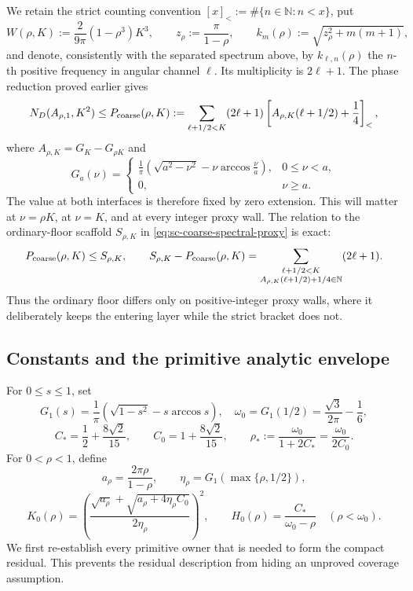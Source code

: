 \documentclass[11pt]{article}
\numberwithin{equation}{section}
\theoremstyle{definition}
\theoremstyle{remark}
\begin{document}
We retain the strict counting convention
\([x]_<:=\#\{n\in\mathbb N:n<x\}\), put
\[
 W(\rho,K):=\frac{2}{9\pi}(1-\rho^3)K^3,
 \qquad z_\rho:=\frac{\pi}{1-\rho},
 \qquad k_m(\rho):=\sqrt{z_\rho^2+m(m+1)},
\]
and denote, consistently with the separated spectrum above, by
\(k_{\ell,n}(\rho)\) the \(n\)-th positive frequency in
angular channel \(\ell\).  Its multiplicity is \(2\ell+1\).  The phase
reduction proved earlier gives
\begin{equation}
 N_D(A_{\rho,1},K^2)
 \le P_{\rm coarse}(\rho,K)
 :=\sum_{\ell+1/2<K}(2\ell+1)
 \left[A_{\rho,K}(\ell+1/2)+\frac14\right]_<,
 \label{cm:eq-coarse}
\end{equation}
where \(A_{\rho,K}=G_K-G_{\rho K}\) and
\[
 G_a(\nu)=
 \begin{cases}
 \displaystyle\frac1\pi\left(\sqrt{a^2-\nu^2}
 -\nu\arccos\frac\nu a\right),&0\leq\nu<a,\\[4pt]
 0,&\nu\geq a.
 \end{cases}
\]
The value at both interfaces is therefore fixed by zero extension.  This
 will matter at \(\nu=\rho K\), at \(\nu=K\), and at every integer proxy
 wall.
The relation to the ordinary-floor scaffold
\(S_{\rho,K}\) in \eqref{eq:sc-coarse-spectral-proxy} is exact:
\begin{equation}
 P_{\rm coarse}(\rho,K)\leq S_{\rho,K},\qquad
 S_{\rho,K}-P_{\rm coarse}(\rho,K)
 =\sum_{\substack{\ell+1/2<K\\
 A_{\rho,K}(\ell+1/2)+1/4\in\mathbb N}}
 (2\ell+1).
 \label{cm:eq-strict-ordinary-proxy-difference}
\end{equation}
Thus the ordinary floor differs only on positive-integer proxy walls, where
it deliberately keeps the entering layer while the strict bracket does not.

\subsection{Constants and the primitive analytic envelope}

For \(0\leq s\leq1\), set
\[
 G_1(s)=\frac1\pi\left(\sqrt{1-s^2}-s\arccos s\right),
 \quad
 \omega_0=G_1(1/2)=\frac{\sqrt3}{2\pi}-\frac16,
\]
\[
 C_*=\frac12+\frac{8\sqrt2}{15},\qquad
 C_0=1+\frac{8\sqrt2}{15},\qquad
 \rho_*:=\frac{\omega_0}{1+2C_*}=\frac{\omega_0}{2C_0}.
\]
For \(0<\rho<1\), define
\[
 a_\rho=\frac{2\pi\rho}{1-\rho},\qquad
 \eta_\rho=G_1\!\left(\max\{\rho,1/2\}\right),
\]
\begin{equation}
 K_0(\rho)=
 \left(
 \frac{\sqrt{a_\rho}+\sqrt{a_\rho+4\eta_\rho C_0}}
 {2\eta_\rho}
 \right)^2,
 \qquad
 H_0(\rho)=\frac{C_*}{\omega_0-\rho}\quad(\rho<\omega_0).
 \label{cm:eq-upper-functions}
\end{equation}
We first re-establish every primitive owner that is needed to form the
compact residual.  This prevents the residual description from hiding an
unproved coverage assumption.
\end{document}
